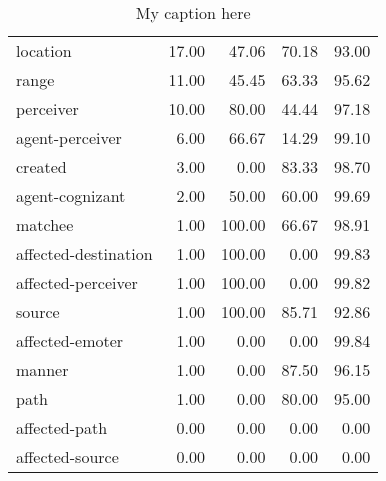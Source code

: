 \begin{table}[!ht]
\begin{tabular}{lrrrr}
location             &    17.00 &                       47.06 &                   70.18 &                   93.00 \\
range                &    11.00 &                       45.45 &                   63.33 &                   95.62 \\
perceiver            &    10.00 &                       80.00 &                   44.44 &                   97.18 \\
agent-perceiver      &     6.00 &                       66.67 &                   14.29 &                   99.10 \\
created              &     3.00 &                        0.00 &                   83.33 &                   98.70 \\
agent-cognizant      &     2.00 &                       50.00 &                   60.00 &                   99.69 \\
matchee              &     1.00 &                      100.00 &                   66.67 &                   98.91 \\
affected-destination &     1.00 &                      100.00 &                    0.00 &                   99.83 \\
affected-perceiver   &     1.00 &                      100.00 &                    0.00 &                   99.82 \\
source               &     1.00 &                      100.00 &                   85.71 &                   92.86 \\
affected-emoter      &     1.00 &                        0.00 &                    0.00 &                   99.84 \\
manner               &     1.00 &                        0.00 &                   87.50 &                   96.15 \\
path                 &     1.00 &                        0.00 &                   80.00 &                   95.00 \\
affected-path        &     0.00 &                        0.00 &                    0.00 &                    0.00 \\
affected-source      &     0.00 &                        0.00 &                    0.00 &                    0.00 \\
\bottomrule
\end{tabular}
\caption{My caption here}
\label{tab:PARTICIPANT_ROLE-oe-relative}
\end{table}